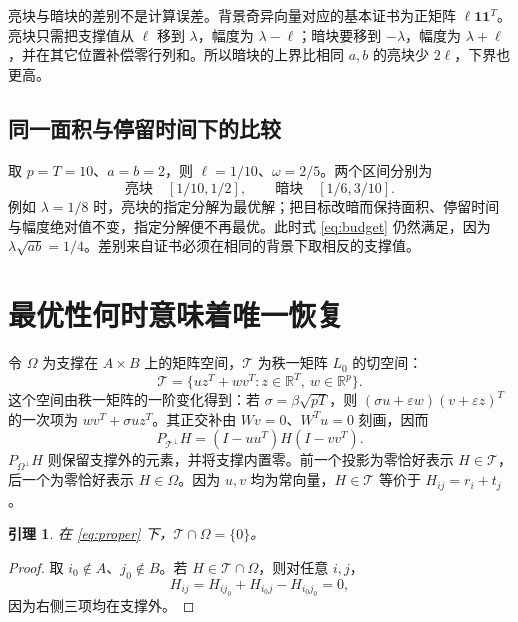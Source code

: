 \documentclass[UTF8,fontset=none,zihao=-4,a4paper]{ctexart}
\theoremstyle{plainzh}
\newtheorem{lemma}[theorem]{引理}
\newcommand{\R}{\mathbb R}
\newcommand{\one}{\bm 1}
\numberwithin{equation}{section}
\begin{document}
亮块与暗块的差别不是计算误差。背景奇异向量对应的基本证书为正矩阵 $\ell\one\one^T$。亮块只需把支撑值从 $\ell$ 移到 $\lambda$，幅度为 $\lambda-\ell$；暗块要移到 $-\lambda$，幅度为 $\lambda+\ell$，并在其它位置补偿零行列和。所以暗块的上界比相同 $a,b$ 的亮块少 $2\ell$，下界也更高。

\subsection{同一面积与停留时间下的比较}
取 \(p=T=10\)、\(a=b=2\)，则 \(\ell=1/10\)、\(\omega=2/5\)。两个区间分别为
\[
  \text{亮块}\quad [1/10,1/2],\qquad
  \text{暗块}\quad [1/6,3/10].
\]
例如 \(\lambda=1/8\) 时，亮块的指定分解为最优解；把目标改暗而保持面积、停留时间与幅度绝对值不变，指定分解便不再最优。此时式 \eqref{eq:budget} 仍然满足，因为 \(\lambda\sqrt{ab}=1/4\)。差别来自证书必须在相同的背景下取相反的支撑值。

\section{最优性何时意味着唯一恢复}

令 $\Omega$ 为支撑在 $A\times B$ 上的矩阵空间，$\mathcal T$ 为秩一矩阵 $L_0$ 的切空间：
\[
 \mathcal T=\{u z^T+w v^T:z\in\R^T,\ w\in\R^p\}.
\]
这个空间由秩一矩阵的一阶变化得到：若 \(\sigma=\beta\sqrt{pT}\)，则
\((\sigma u+\varepsilon w)(v+\varepsilon z)^T\) 的一次项为 \(wv^T+\sigma uz^T\)。其正交补由 \(Wv=0\)、\(W^Tu=0\) 刻画，因而
\[
 P_{\mathcal T^\perp}H=(I-uu^T)H(I-vv^T).
\]
\(P_{\Omega^\perp}H\) 则保留支撑外的元素，并将支撑内置零。前一个投影为零恰好表示 \(H\in\mathcal T\)，后一个为零恰好表示 \(H\in\Omega\)。因为 \(u,v\) 均为常向量，\(H\in\mathcal T\) 等价于 \(H_{ij}=r_i+t_j\)。

\begin{lemma}\label{lem:intersection}
在 \eqref{eq:proper} 下，$\mathcal T\cap\Omega=\{0\}$。
\end{lemma}
\begin{proof}
取 $i_0\notin A$、$j_0\notin B$。若 $H\in\mathcal T\cap\Omega$，则对任意 $i,j$，
\[
 H_{ij}=H_{i j_0}+H_{i_0 j}-H_{i_0j_0}=0,
\]
因为右侧三项均在支撑外。
\end{proof}
\end{document}
